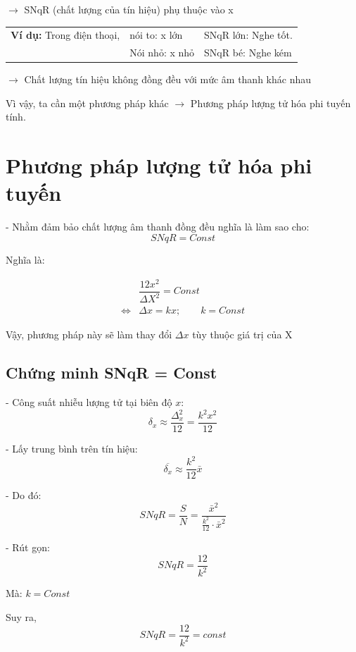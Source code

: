 $\rightarrow$ SNqR (chất lượng của tín hiệu) phụ thuộc vào x

\vspace{0.5cm}

\noindent\begin{tabular}[t]{@{}l@{\ }l@{\ $\rightarrow$\ }l@{}}
    \textbf{Ví dụ:} Trong điện thoại, & nói to: x lớn  & SNqR lớn: Nghe tốt. \\
                                     & Nói nhỏ: x nhỏ & SNqR bé: Nghe kém
\end{tabular}

$\rightarrow$ Chất lượng tín hiệu không đồng đều với mức âm thanh khác nhau


Vì vậy, ta cần một phương pháp khác $\rightarrow$ Phương pháp lượng tử hóa phi tuyến tính.

\section{Phương pháp lượng tử hóa phi tuyến}

- Nhằm đảm bảo chất lượng âm thanh đồng đều nghĩa là làm sao cho:
\[
    SNqR = Const
\]

Nghĩa là:

\[
    \begin{aligned}
        &\dfrac{12x^2}{\Delta X^2} = Const\\[6pt]
        \iff &\Delta x = kx; \quad \quad k = Const
    \end{aligned}
\]

Vậy, phương pháp này sẽ làm thay đổi $\Delta x$ tùy thuộc giá trị của X

\subsection{Chứng minh SNqR = Const}
- Công suất nhiễu lượng tử tại biên độ $x$:
\[
    \delta_x \approx \dfrac{\Delta_x^2}{12} = \dfrac{k^2 x^2}{12}
\]

- Lấy trung bình trên tín hiệu:
\[
    \overline{\delta_x} \approx \dfrac{k^2}{12} \bar{x}
\]

- Do đó:
\[
    SNqR = \dfrac{S}{N} = \dfrac{\bar{x}^2}{\frac{k^2}{12} \cdot \bar{x}^2}
\]

- Rút gọn:
\[
    SNqR = \dfrac{12}{k^2}
\]

\hspace*{1cm}Mà: $k = Const$

Suy ra, 
\[
    \boxed{SNqR = \dfrac{12}{k^2} = const}
\]

